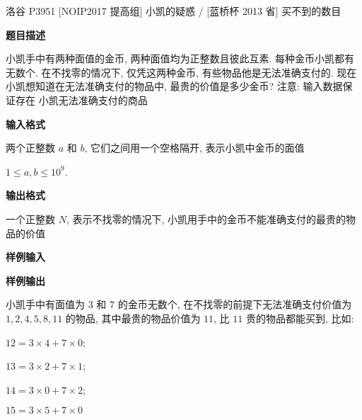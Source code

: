 \begin{frame}{洛谷 P3951 {[}NOIP2017 提高组{]} 小凯的疑惑 / {[}蓝桥杯 2013 省{]} 买不到的数目}
	\label{prime:example:lgp3951}

	\textbf{题目描述}

	小凯手中有两种面值的金币, 两种面值均为正整数且彼此互素. 每种金币小凯都有无数个. 在不找零的情况下, 仅凭这两种金币, 有些物品他是无法准确支付的. 现在小凯想知道在无法准确支付的物品中, 最贵的价值是多少金币? 注意: 输入数据保证存在 小凯无法准确支付的商品

	\textbf{输入格式}

	两个正整数 \(a\) 和 \(b\), 它们之间用一个空格隔开, 表示小凯中金币的面值

	\(1 \le a,b \le 10^9\).

	\textbf{输出格式}

	一个正整数 \(N\), 表示不找零的情况下, 小凯用手中的金币不能准确支付的最贵的物品的价值

	\textbf{样例输入}


	\textbf{样例输出}


	小凯手中有面值为 \(3\) 和 \(7\) 的金币无数个, 在不找零的前提下无法准确支付价值为 \(1,2,4,5,8,11\) 的物品, 其中最贵的物品价值为 \(11\), 比 \(11\) 贵的物品都能买到, 比如:

	\(12 = 3 \times 4 + 7 \times 0\);

	\(13 = 3 \times 2 + 7 \times 1\);

	\(14 = 3 \times 0 + 7 \times 2\);

	\(15 = 3 \times 5 + 7 \times 0 \)
\end{frame}


